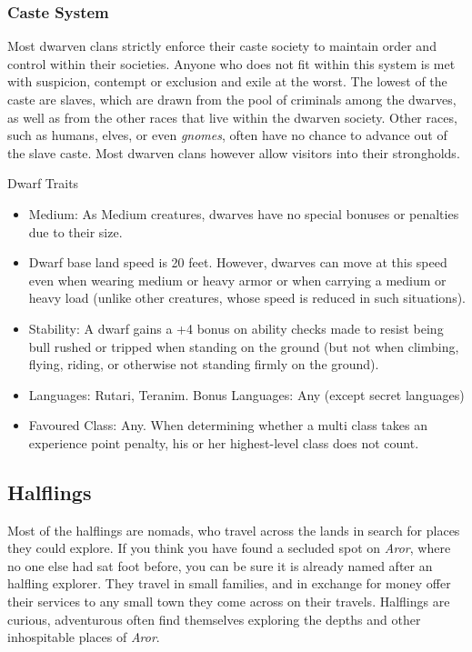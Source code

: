\subsubsection*{Caste System}

Most dwarven clans strictly enforce their caste society to maintain order and
control within their societies. Anyone who does not fit within this system is
met with suspicion, contempt or exclusion and exile at the worst. The lowest
of the caste are slaves, which are drawn from the pool of criminals among the
dwarves, as well as from the other races that live within the dwarven society.
Other races, such as humans, elves, or even \emph{gnomes}, often have no chance
to advance out of the slave caste. Most dwarven clans however allow visitors
into their strongholds.

\begin{35e}{Dwarf Traits}
  \begin{itemize}[noitemsep]
    \item Medium: As Medium creatures, dwarves have no special bonuses or
      penalties due to their size.
    \item Dwarf base land speed is 20 feet. However, dwarves can move at this
      speed even when wearing medium or heavy armor or when carrying a medium or
      heavy load (unlike other creatures, whose speed is reduced in such
      situations).
    \item Stability: A dwarf gains a +4 bonus on ability checks made to resist
      being bull rushed or tripped when standing on the ground (but not when
      climbing, flying, riding, or otherwise not standing firmly on the
      ground).
    \item Languages: Rutari, Teranim. Bonus Languages: Any (except secret
      languages)
    \item Favoured Class: Any. When determining whether a multi class takes an
          experience point penalty, his or her highest-level class does not
          count.
  \end{itemize}
\end{35e}

\subsection{Halflings}
\label{sec:Halflings}

Most of the halflings are nomads, who travel across the lands in search for
places they could explore. If you think you have found a secluded spot on
\emph{Aror}, where no one else had sat foot before, you can be sure it is
already named after an halfling explorer. They travel in small families, and
in exchange for money offer their services to any small town they come across
on their travels. Halflings are curious, adventurous often find themselves
exploring the depths and other inhospitable places of \emph{Aror}.

